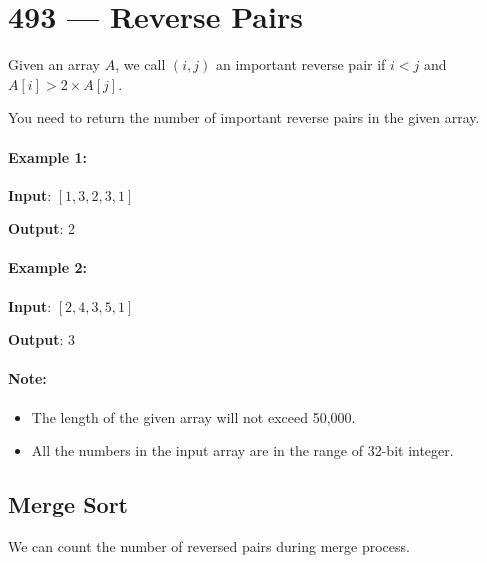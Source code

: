 \section{493 --- Reverse Pairs}
Given an array $A$, we call $(i, j)$ an important reverse pair if $i < j$ and $A[i] > 2\times A[j]$.

You need to return the number of important reverse pairs in the given array.

\paragraph{Example 1:}

\begin{flushleft}
\textbf{Input}: $[1,3,2,3,1]$

\textbf{Output}: 2

\end{flushleft}

\paragraph{Example 2:}

\begin{flushleft}
\textbf{Input}: $[2,4,3,5,1]$

\textbf{Output}: 3
\end{flushleft}

\paragraph{Note:}
\begin{itemize}
\item The length of the given array will not exceed 50,000.
\item All the numbers in the input array are in the range of 32-bit integer.
\end{itemize}

\subsection{Merge Sort}
We can count the number of reversed pairs during merge process.

